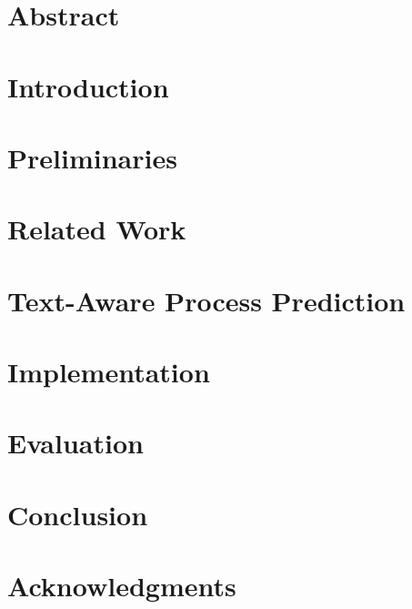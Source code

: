 \documentclass[a4paper,11pt,twoside]{pads-thesis}
\begin{document}

\gTitlePage

\chapter*{Abstract} 


\tableofcontents

\cleardoublepage
\pagestyle{fancy}

\chapter{Introduction} \label{chap:intro}


\chapter{Preliminaries} \label{chap:prelim}


\chapter{Related Work} \label{chap:related_work}


\chapter{Text-Aware Process Prediction} \label{chap:concept}


\chapter{Implementation} \label{chap:impl}


\chapter{Evaluation} \label{chap:eval}


\chapter{Conclusion} \label{chap:conclusion}



\chapter*{Acknowledgments}


\end{document}

